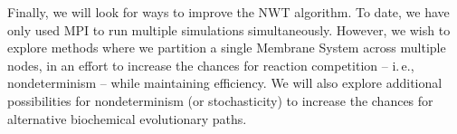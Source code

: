 \documentclass[copyright]{eptcs}
\begin{document}
Finally, we will look for ways to improve the NWT algorithm.  To date, we have only used MPI to run multiple simulations simultaneously.  However, we wish to explore methods where we partition a single Membrane System across multiple nodes, in an effort to increase the chances for reaction competition -- i.\,e., nondeterminism -- while maintaining efficiency.  We will also explore additional possibilities for nondeterminism (or stochasticity) to increase the chances for alternative biochemical evolutionary paths.



















































\end{document}
